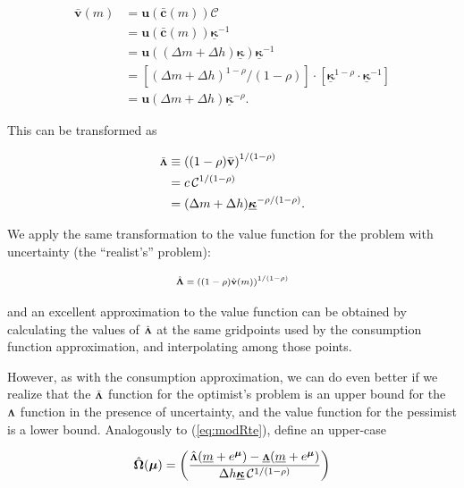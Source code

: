 \documentclass[preprint,authoryear]{elsarticle}
\newcommand{\uFunc}{\mathbf{u}}
\newcommand{\CRRA}{\rho}
\newcommand{\cNrm}{c}
\newcommand{\mNrm}{m}
\newcommand{\vFunc}{\mathbf{v}}
\newcommand{\vInv}{{\scriptsize \boldsymbol{\Lambda}}}
\newcommand{\vInvOpt}{\bar{\vInv}}
\newcommand{\vInvReal}{\hat{\vInv}}
\newcommand{\cFunc}{\mathbf{c}}
\newcommand{\cFuncOpt}{\bar{\cFunc}}
\newcommand{\hNrm}{h}
\newcommand{\MPC}{\boldsymbol{\kappa}}
\newcommand{\MPCmin}{\underline{\MPC}}
\newcommand{\mNrmMin}{\underline{\mNrm}}
\newcommand{\logmNrmEx}{\boldsymbol{\mu}}
\newcommand{\mNrmEx}{\Delta \mNrm}
\newcommand{\hNrmEx}{\Delta \hNrm}
\newcommand{\PDVCoverc}{\mathcal{C}}
\newcommand{\vFuncOpt}{\bar{\vFunc}}
\newcommand{\vFuncReal}{\hat{\vFunc}}
\newcommand{\vInvPes}{\underline{\vInv}}
\newcommand{\valModRte}{\boldsymbol{\Omega}}
\newcommand{\valModRteReal}{\hat{\valModRte}}
\begin{document}
\begin{equation}
\label{eq:vFuncPF}
\begin{aligned}
\vFuncOpt(\mNrm) &= \uFunc(\cFuncOpt(\mNrm))\PDVCoverc \\
&= \uFunc(\cFuncOpt(\mNrm))\MPCmin^{-1} \\
&= \uFunc((\mNrmEx+\hNrmEx)\MPCmin) \MPCmin^{-1} \\
&= \left[(\mNrmEx+\hNrmEx)^{1-\CRRA}/(1-\CRRA)\right] \cdot \left[\MPCmin^{1-\CRRA} \cdot \MPCmin^{-1}\right] \\
&= \uFunc(\mNrmEx+\hNrmEx)\MPCmin^{-\CRRA}.
\end{aligned}
\end{equation}

This can be transformed as

\begin{equation}
\begin{aligned}
\vInvOpt &\equiv  \left((1-\CRRA)\vFuncOpt\right)^{1/(1-\CRRA)}   \\
&= \cNrm\,\PDVCoverc^{1/(1-\CRRA)} \\
&= (\mNrmEx+\hNrmEx)\MPCmin^{-\CRRA/(1-\CRRA)}.
\end{aligned}
\end{equation}

We apply the same transformation to the value function for the problem with
uncertainty (the ``realist's'' problem):

\begin{equation}
\vInvReal = \left((1-\CRRA)\vFuncReal(\mNrm)\right)^{1/(1-\CRRA)}
\end{equation}

and an excellent approximation to the value function can be obtained by
calculating the values of $\vInvReal$ at the same gridpoints used by the
consumption function approximation, and interpolating among those points.

However, as with the consumption approximation, we can do even better if we
realize that the $\vInvOpt$ function for the optimist's problem is an upper
bound for the $\vInv$ function in the presence of uncertainty, and the value
function for the pessimist is a lower bound. Analogously to (\ref{eq:modRte}),
define an upper-case

\begin{equation}
\label{eq:valModRteReal}
\valModRteReal(\logmNrmEx) = \left(\frac{\vInvReal(\mNrmMin+e^{\logmNrmEx})-\vInvPes(\mNrmMin+e^{\logmNrmEx})}{\hNrmEx \MPCmin \,\PDVCoverc^{1/(1-\CRRA)}}\right)
\end{equation}
\end{document}
